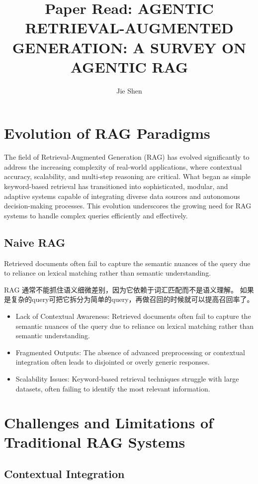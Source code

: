 \documentclass{article}
\title{Paper Read: AGENTIC RETRIEVAL-AUGMENTED GENERATION: A SURVEY ON
AGENTIC RAG}
\author{Jie Shen}
\begin{document}
\maketitle
\section{Evolution of RAG Paradigms}
The field of Retrieval-Augmented Generation (RAG) has evolved significantly to address the increasing complexity of
real-world applications, where contextual accuracy, scalability, and multi-step reasoning are critical. What began as
simple keyword-based retrieval has transitioned into sophisticated, modular, and adaptive systems capable of integrating
diverse data sources and autonomous decision-making processes. This evolution underscores the growing need for
RAG systems to handle complex queries efficiently and effectively.

\subsection{Naive RAG}
Retrieved documents often fail to capture the semantic nuances of the query
due to reliance on lexical matching rather than semantic understanding.

RAG 通常不能抓住语义细微差别，因为它依赖于词汇匹配而不是语义理解。
如果是复杂的query可把它拆分为简单的query，再做召回的时候就可以提高召回率了。
\begin{itemize}
\item Lack of Contextual Awareness: Retrieved documents often fail to capture the semantic nuances of the query
due to reliance on lexical matching rather than semantic understanding.
\item Fragmented Outputs: The absence of advanced preprocessing or contextual integration often leads to
disjointed or overly generic responses.
\item Scalability Issues: Keyword-based retrieval techniques struggle with large datasets, often failing to identify
the most relevant information.
\end{itemize}

\section{Challenges and Limitations of Traditional RAG Systems}
\subsection{Contextual Integration}
\end{document}
